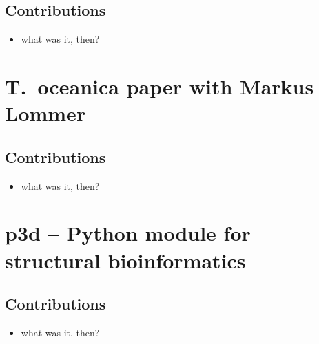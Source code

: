 \subsection*{Contributions}

\begin{itemize}
\item what was it, then?
\end{itemize}


\cleardoublepage
\section{T.~oceanica paper with Markus Lommer}

\subsection*{Contributions}

\begin{itemize}
\item what was it, then?
\end{itemize}


\cleardoublepage
\section{p3d -- Python module for structural bioinformatics}

\subsection*{Contributions}

\begin{itemize}
\item what was it, then?
\end{itemize}

